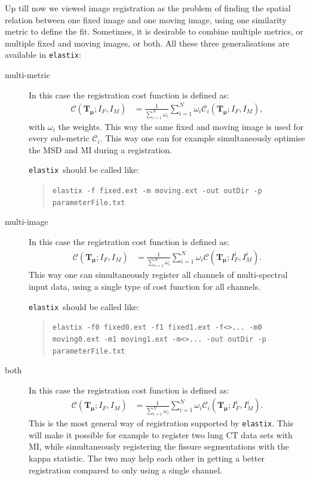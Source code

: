 \documentclass[]{report}
\newcommand{\elastix}{\texttt{elastix}}
\newcommand{\vmu}{\bm{\mu}}
\newcommand{\vTm}{\bm{T}_{\vmu}}
\newcommand{\CC}{\mathcal{C}}
\begin{document}
Up till now we viewed image registration as the problem of finding
the spatial relation between one fixed image and one moving image,
using one similarity metric to define the fit. Sometimes, it is
desirable to combine multiple metrics, or multiple fixed and moving
images, or both. All these three generalisations are available in \elastix:
\begin{description}
\item[multi-metric] In this case the registration cost function is defined
as:
\begin{align}
\CC(\vTm; I_F, I_M) &= \frac{1}{\sum_{i=1}^N \omega_i} \sum_{i=1}^N
\omega_i \CC_i(\vTm; I_F, I_M),
\end{align}
with $\omega_i$ the weights. This way the same fixed and moving
image is used for every sub-metric $\CC_i$. This way one can for
example simultaneously optimise the MSD and MI during a
registration.

\elastix\ should be called like:
\begin{quote}
\texttt{elastix -f fixed.ext -m moving.ext -out outDir -p parameterFile.txt}
\end{quote}

\item[multi-image] In this case the registration cost function is defined
as:
\begin{align}
\CC(\vTm; I_F, I_M) &= \frac{1}{\sum_{i=1}^N \omega_i} \sum_{i=1}^N
\omega_i \CC(\vTm; I_F^i, I_M^i).
\end{align}
This way one can simultaneously register all channels of
multi-spectral input data, using a single type of cost function for
all channels.

\elastix\ should be called like:
\begin{quote}
\texttt{elastix -f0 fixed0.ext -f1 fixed1.ext -f<>... -m0 moving0.ext -m1
moving1.ext -m<>... -out outDir -p parameterFile.txt}
\end{quote}

\item[both] In this case the registration cost function is defined
as:
\begin{align}
\CC(\vTm; I_F, I_M) &= \frac{1}{\sum_{i=1}^N \omega_i} \sum_{i=1}^N
\omega_i \CC_i(\vTm; I_F^i, I_M^i).
\end{align}
This is the most general way of registration supported by \elastix.
This will make it possible for example to register two lung CT data
sets with MI, while simultaneously registering the fissure
segmentations with the kappa statistic. The two may help each other
in getting a better registration compared to only using a single channel.
\end{description}
\end{document}
